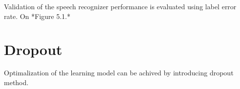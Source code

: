 
Validation of the speech recognizer performance is evaluated using label error rate.
On *Figure 5.1.*



\section{Dropout}

Optimalization of the learning model can be achived by introducing dropout method.
